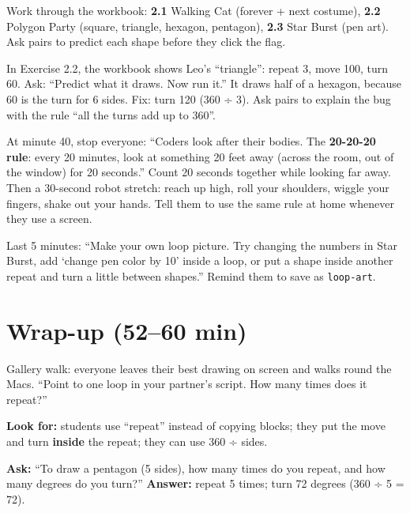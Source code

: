 Work through the workbook: \textbf{2.1} Walking Cat (forever + next costume), \textbf{2.2} Polygon Party (square, triangle, hexagon, pentagon), \textbf{2.3} Star Burst (pen art). Ask pairs to predict each shape before they click the flag.

\begin{bughunt}
In Exercise 2.2, the workbook shows Leo's \enquote{triangle}: repeat 3, move 100, turn 60. Ask: \enquote{Predict what it draws. Now run it.} It draws half of a hexagon, because 60 is the turn for 6 sides. Fix: turn 120 (360 ÷ 3). Ask pairs to explain the bug with the rule \enquote{all the turns add up to 360}.
\end{bughunt}

\begin{safety}
At minute 40, stop everyone: \enquote{Coders look after their bodies. The \textbf{20-20-20 rule}: every 20 minutes, look at something 20 feet away (across the room, out of the window) for 20 seconds.} Count 20 seconds together while looking far away. Then a 30-second robot stretch: reach up high, roll your shoulders, wiggle your fingers, shake out your hands. Tell them to use the same rule at home whenever they use a screen.
\end{safety}

\begin{freebuild}
Last 5 minutes: \enquote{Make your own loop picture. Try changing the numbers in Star Burst, add \enquote{change pen color by 10} inside a loop, or put a shape inside another repeat and turn a little between shapes.} Remind them to save as \texttt{loop-art}.
\end{freebuild}

\section{Wrap-up (52--60 min)}
\begin{teacherscript}
Gallery walk: everyone leaves their best drawing on screen and walks round the Macs. \enquote{Point to one loop in your partner's script. How many times does it repeat?}
\end{teacherscript}

\begin{formativecheck}
\textbf{Look for:} students use \enquote{repeat} instead of copying blocks; they put the move and turn \textbf{inside} the repeat; they can use 360 ÷ sides.

\textbf{Ask:} \enquote{To draw a pentagon (5 sides), how many times do you repeat, and how many degrees do you turn?}
\textbf{Answer:} repeat 5 times; turn 72 degrees (360 ÷ 5 = 72).
\end{formativecheck}

